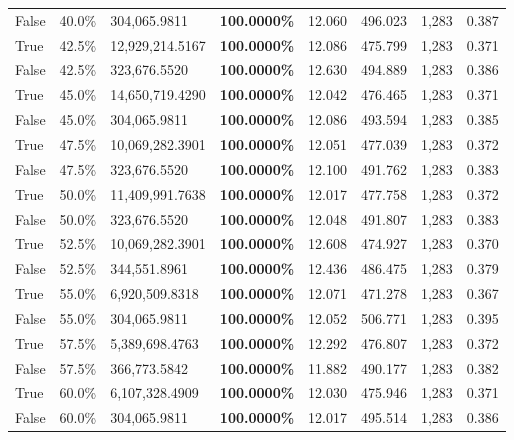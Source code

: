 \begin{table}[H]
\begin{tabular}{lllrllll}
\cline{1-8}
False & 40.0\% & \color{red} 304,065.9811 & \bfseries \color{red} 100.0000\% & 12.060 & 496.023 & 1,283 & 0.387 \\
\cline{1-8}
True & 42.5\% & 12,929,214.5167 & \bfseries \color{red} 100.0000\% & 12.086 & 475.799 & 1,283 & 0.371 \\
\cline{1-8}
False & 42.5\% & 323,676.5520 & \bfseries \color{red} 100.0000\% & 12.630 & 494.889 & 1,283 & 0.386 \\
\cline{1-8}
True & 45.0\% & 14,650,719.4290 & \bfseries \color{red} 100.0000\% & 12.042 & 476.465 & 1,283 & 0.371 \\
\cline{1-8}
False & 45.0\% & \color{red} 304,065.9811 & \bfseries \color{red} 100.0000\% & 12.086 & 493.594 & 1,283 & 0.385 \\
\cline{1-8}
True & 47.5\% & 10,069,282.3901 & \bfseries \color{red} 100.0000\% & 12.051 & 477.039 & 1,283 & 0.372 \\
\cline{1-8}
False & 47.5\% & 323,676.5520 & \bfseries \color{red} 100.0000\% & 12.100 & 491.762 & 1,283 & 0.383 \\
\cline{1-8}
True & 50.0\% & 11,409,991.7638 & \bfseries \color{red} 100.0000\% & 12.017 & 477.758 & 1,283 & 0.372 \\
\cline{1-8}
False & 50.0\% & 323,676.5520 & \bfseries \color{red} 100.0000\% & 12.048 & 491.807 & 1,283 & 0.383 \\
\cline{1-8}
True & 52.5\% & 10,069,282.3901 & \bfseries \color{red} 100.0000\% & 12.608 & 474.927 & 1,283 & 0.370 \\
\cline{1-8}
False & 52.5\% & 344,551.8961 & \bfseries \color{red} 100.0000\% & 12.436 & 486.475 & 1,283 & 0.379 \\
\cline{1-8}
True & 55.0\% & 6,920,509.8318 & \bfseries \color{red} 100.0000\% & 12.071 & 471.278 & 1,283 & 0.367 \\
\cline{1-8}
False & 55.0\% & \color{red} 304,065.9811 & \bfseries \color{red} 100.0000\% & 12.052 & 506.771 & 1,283 & 0.395 \\
\cline{1-8}
True & 57.5\% & 5,389,698.4763 & \bfseries \color{red} 100.0000\% & 12.292 & 476.807 & 1,283 & 0.372 \\
\cline{1-8}
False & 57.5\% & 366,773.5842 & \bfseries \color{red} 100.0000\% & 11.882 & 490.177 & 1,283 & 0.382 \\
\cline{1-8}
True & 60.0\% & 6,107,328.4909 & \bfseries \color{red} 100.0000\% & 12.030 & 475.946 & 1,283 & 0.371 \\
\cline{1-8}
False & 60.0\% & \color{red} 304,065.9811 & \bfseries \color{red} 100.0000\% & 12.017 & 495.514 & 1,283 & 0.386 \\

\end{tabular}
\end{table}
